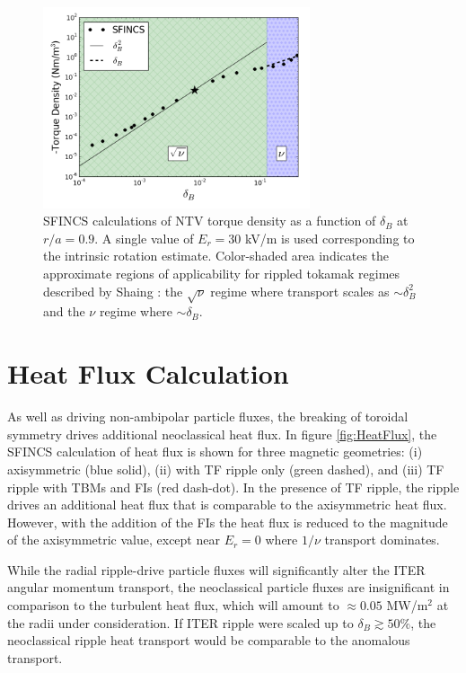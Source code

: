 \documentclass{article}
\begin{document}
\begin{figure}[h!]
\centering
\includegraphics[width=0.7\textwidth]
{scalescan.png}
\caption{\label{fig:scalescan} SFINCS calculations of NTV torque density as a function of $\delta_B$ at $r/a = 0.9$. A single value of $E_r = 30$ kV/m is used corresponding to the intrinsic rotation estimate. Color-shaded area indicates the approximate regions of applicability for rippled tokamak regimes described by Shaing \cite{Shaing2010, Shaing2008}: the $\sqrt{\nu}$ regime where transport scales as $\sim \delta_B^2$ and the $\nu$ regime where $\sim \delta_B$. }
\end{figure} 

\FloatBarrier

\section{Heat Flux Calculation}\label{heatflux}

As well as driving non-ambipolar particle fluxes, the breaking of toroidal symmetry drives additional neoclassical heat flux. In figure \ref{fig:HeatFlux}, the SFINCS calculation of heat flux is shown for three magnetic geometries: (i) axisymmetric (blue solid), (ii) with TF ripple only (green dashed), and (iii) TF ripple with TBMs and FIs (red dash-dot). In the presence of TF ripple, the ripple drives an additional heat flux that is comparable to the axisymmetric heat flux. However, with the addition of the FIs the heat flux is reduced to the magnitude of the axisymmetric value, except near $E_r = 0$ where $1/\nu$ transport dominates. 

While the radial ripple-drive particle fluxes will significantly alter the ITER angular momentum transport, the neoclassical particle fluxes are insignificant in comparison to the turbulent heat flux, which will amount to $\approx 0.05$ MW/m$^2$ at the radii under consideration. If ITER ripple were scaled up to $\delta_B \gtrsim 50\%$, the neoclassical ripple heat transport would be comparable to the anomalous transport.
\end{document}
